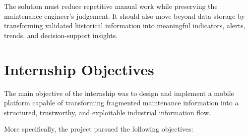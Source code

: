 The solution must reduce repetitive manual work while preserving the maintenance engineer's judgement. It should also move beyond data storage by transforming validated historical information into meaningful indicators, alerts, trends, and decision-support insights.



\section{Internship Objectives}
\label{sec:internship-objectives}

The main objective of the internship was to design and implement a mobile platform capable of transforming fragmented maintenance information into a structured, trustworthy, and exploitable industrial information flow.

More specifically, the project pursued the following objectives:

